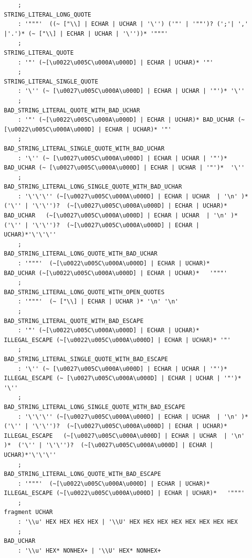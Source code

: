 \begin{appendices}
\begin{lstlisting}
    ;
STRING_LITERAL_LONG_QUOTE
    : '"""'  ((~ ["\\] | ECHAR | UCHAR | '\'') ('"' | '""')? (';'| ',' |'.')* (~ ["\\] | ECHAR | UCHAR | '\''))* '"""'
    ;
STRING_LITERAL_QUOTE
    : '"' (~[\u0022\u005C\u000A\u000D] | ECHAR | UCHAR)* '"' 
    ;
STRING_LITERAL_SINGLE_QUOTE
    : '\'' (~ [\u0027\u005C\u000A\u000D] | ECHAR | UCHAR | '"')* '\''
    ;
BAD_STRING_LITERAL_QUOTE_WITH_BAD_UCHAR
    : '"' (~[\u0022\u005C\u000A\u000D] | ECHAR | UCHAR)* BAD_UCHAR (~[\u0022\u005C\u000A\u000D] | ECHAR | UCHAR)* '"' 
    ;
BAD_STRING_LITERAL_SINGLE_QUOTE_WITH_BAD_UCHAR
    : '\'' (~ [\u0027\u005C\u000A\u000D] | ECHAR | UCHAR | '"')*  BAD_UCHAR (~ [\u0027\u005C\u000A\u000D] | ECHAR | UCHAR | '"')*  '\''
    ;
BAD_STRING_LITERAL_LONG_SINGLE_QUOTE_WITH_BAD_UCHAR
    : '\'\'\'' (~[\u0027\u005C\u000A\u000D] | ECHAR | UCHAR  | '\n' )*  ('\'' | '\'\'')?  (~[\u0027\u005C\u000A\u000D] | ECHAR | UCHAR)* BAD_UCHAR   (~[\u0027\u005C\u000A\u000D] | ECHAR | UCHAR  | '\n' )*  ('\'' | '\'\'')?  (~[\u0027\u005C\u000A\u000D] | ECHAR | UCHAR)*'\'\'\''  
    ;
BAD_STRING_LITERAL_LONG_QUOTE_WITH_BAD_UCHAR
    : '"""'  (~[\u0022\u005C\u000A\u000D] | ECHAR | UCHAR)*   BAD_UCHAR (~[\u0022\u005C\u000A\u000D] | ECHAR | UCHAR)*   '"""'
    ;
BAD_STRING_LITERAL_LONG_QUOTE_WITH_OPEN_QUOTES
    : '"""'  (~ ["\\] | ECHAR | UCHAR )* '\n' '\n'
    ;
BAD_STRING_LITERAL_QUOTE_WITH_BAD_ESCAPE
    : '"' (~[\u0022\u005C\u000A\u000D] | ECHAR | UCHAR)* ILLEGAL_ESCAPE (~[\u0022\u005C\u000A\u000D] | ECHAR | UCHAR)* '"' 
    ;
BAD_STRING_LITERAL_SINGLE_QUOTE_WITH_BAD_ESCAPE
    : '\'' (~ [\u0027\u005C\u000A\u000D] | ECHAR | UCHAR | '"')*  ILLEGAL_ESCAPE (~ [\u0027\u005C\u000A\u000D] | ECHAR | UCHAR | '"')*  '\''
    ;
BAD_STRING_LITERAL_LONG_SINGLE_QUOTE_WITH_BAD_ESCAPE
    : '\'\'\'' (~[\u0027\u005C\u000A\u000D] | ECHAR | UCHAR  | '\n' )*  ('\'' | '\'\'')?  (~[\u0027\u005C\u000A\u000D] | ECHAR | UCHAR)* ILLEGAL_ESCAPE   (~[\u0027\u005C\u000A\u000D] | ECHAR | UCHAR  | '\n' )*  ('\'' | '\'\'')?  (~[\u0027\u005C\u000A\u000D] | ECHAR | UCHAR)*'\'\'\''  
    ;
BAD_STRING_LITERAL_LONG_QUOTE_WITH_BAD_ESCAPE
    : '"""'  (~[\u0022\u005C\u000A\u000D] | ECHAR | UCHAR)*   ILLEGAL_ESCAPE (~[\u0022\u005C\u000A\u000D] | ECHAR | UCHAR)*   '"""'
    ;
fragment UCHAR
    : '\\u' HEX HEX HEX HEX | '\\U' HEX HEX HEX HEX HEX HEX HEX HEX
    ;
BAD_UCHAR
	: '\\u' HEX* NONHEX+ | '\\U' HEX* NONHEX+ 

\end{lstlisting}
\end{appendices}
